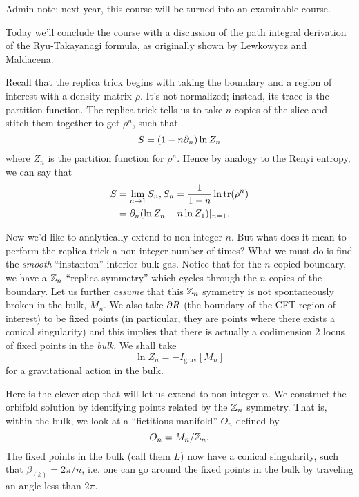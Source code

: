 Admin note: next year, this course will be turned into an examinable course.

Today we'll conclude the course with a discussion of the path integral derivation of the Ryu-Takayanagi formula, as originally shown by Lewkowycz and Maldacena.

Recall that the replica trick begins with taking the boundary and a region of interest with a density matrix $\rho$. %
It's not normalized; instead, its trace is the partition function. The replica trick tells us to take $n$ copies of the slice and stitch them together to get $\rho^n$, such that
\begin{equation}
    S=(1-n \partial_n) \ln Z_n
\end{equation}
where $Z_n$ is the partition function for $\rho^n$. Hence by analogy to the Renyi entropy, we can say that
\begin{align}
    S&=\lim_{n\to 1} S_n, S_n = \frac{1}{1-n} \ln \operatorname{tr}(\rho^n)\\
        &= \partial_n (\ln Z_n - n \ln Z_1)|_{n=1}.
\end{align}

Now we'd like to analytically extend to non-integer $n$. But what does it mean to perform the replica trick a non-integer number of times? What we must do is find the \emph{smooth} ``instanton'' interior bulk gas. Notice that for the $n$-copied boundary, we have a $\mathbb{Z}_n$ ``replica symmetry'' which cycles through the $n$ copies of the boundary. Let us further \emph{assume} that this $\mathbb{Z}_n$ symmetry is not spontaneously broken in the bulk, $M_n$.
We also take $\partial R$ (the boundary of the CFT region of interest) to be fixed points (in particular, they are points where there exists a conical singularity) and this implies that there is actually a codimension 2 locus of fixed points in the \emph{bulk}. We shall take
\begin{equation}
    \ln Z_n = -I_\text{grav}[M_n]
\end{equation}
for a gravitational action in the bulk.

Here is the clever step that will let us extend to non-integer $n$. We construct the orbifold solution by identifying points related by the $\mathbb{Z}_n$ symmetry. That is, within the bulk, we look at a ``fictitious manifold'' $O_n$ defined by
\begin{equation}
    O_n=M_n/\mathbb{Z}_n.
\end{equation}
The fixed points in the bulk (call them $L$) now have a conical singularity, such that $\beta_{(k)}=2\pi/n$, i.e. one can go around the fixed points in the bulk by traveling an angle less than $2\pi$.

